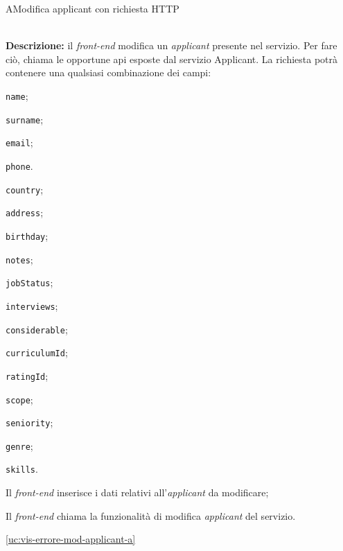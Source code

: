 \begin{usecase}{10}{A}{Modifica applicant con richiesta HTTP}


	\textbf{\\Descrizione:} il \textit{front-end} modifica un \textit{applicant} presente nel servizio. Per fare ciò,
	chiama le opportune \acrshort{api} esposte dal servizio Applicant. La richiesta potrà contenere una qualsiasi combinazione dei campi:
	\begin{ucitemize}
		\item \texttt{name};
		\item \texttt{surname};
		\item \texttt{email};
		\item \texttt{phone}.
		\item \texttt{country};
		\item \texttt{address};
		\item \texttt{birthday};
		\item \texttt{notes};
		\item \texttt{jobStatus};
		\item \texttt{interviews};
		\item \texttt{considerable};
		\item \texttt{curriculumId};
		\item \texttt{ratingId};
		\item \texttt{scope};
		\item \texttt{seniority};
		\item \texttt{genre};
		\item \texttt{skills}.
	\end{ucitemize}

	\begin{ucscenarioprincipale}
		\item Il \textit{front-end} inserisce i dati relativi all'\textit{applicant} da modificare;
		\item Il \textit{front-end} chiama la funzionalità di modifica \textit{applicant} del servizio.
	\end{ucscenarioprincipale}


	\begin{ucestensioni}
		\item \ref{uc:vis-errore-mod-applicant-a}
	\end{ucestensioni}

	\label{uc:richiesta-mod-applicant-a}
\end{usecase}

